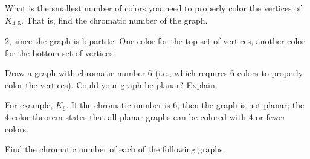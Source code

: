 \begin{questions}


\question What is the smallest number of colors you need to properly color the vertices of $K_{4,5}$.  That is, find the chromatic number of the graph.

	\begin{answer}
		2, since the graph is bipartite.  One color for the top set of vertices, another color for the bottom set of vertices.  %
	\end{answer}
	
	



\question Draw a graph with chromatic number 6 (i.e., which requires 6 colors to properly color the vertices).  Could your graph be planar?  Explain.

	\begin{answer}
		For example, $K_6$.  If the chromatic number is 6, then the graph is not planar; the 4-color theorem states that all planar graphs can be colored with 4 or fewer colors. %
	\end{answer}
	
	
	



\question Find the chromatic number of each of the following graphs.

\begin{center}
  \hfill
  \hfill 
  \hfill
  \hfill
\end{center}


\end{questions}
